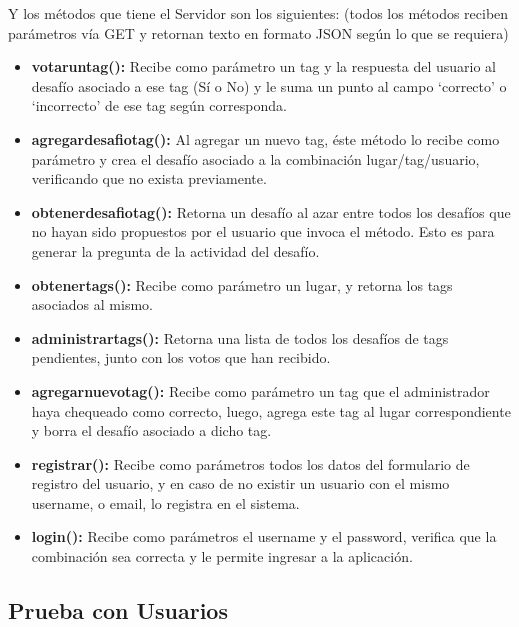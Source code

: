 \documentclass[10pt,letterpaper]{article}
\begin{document}
Y los métodos que tiene el Servidor son los siguientes: (todos los métodos reciben parámetros vía GET y retornan texto en formato JSON según lo que se requiera)\\

\begin{itemize}
\item \textbf{votaruntag():} Recibe como parámetro un tag y la respuesta del usuario al desafío asociado a ese tag (Sí o No) y le suma un punto al campo ‘correcto’ o ‘incorrecto’ de ese tag según corresponda.

\item \textbf{agregardesafiotag():} Al agregar un nuevo tag, éste método lo recibe como parámetro y crea el desafío asociado a la combinación lugar/tag/usuario, verificando que no exista previamente.

\item \textbf{obtenerdesafiotag():} Retorna un desafío al azar entre todos los desafíos que no hayan sido propuestos por el usuario que invoca el método. Esto es para generar la pregunta de la actividad del desafío.

\item \textbf{obtenertags():} Recibe como parámetro un lugar, y retorna los tags asociados al mismo.

\item \textbf{administrartags():} Retorna una lista de todos los desafíos de tags pendientes, junto con los votos que han recibido.

\item \textbf{agregarnuevotag():} Recibe como parámetro un tag que el administrador haya chequeado como correcto, luego, agrega este tag al lugar correspondiente y borra el desafío asociado a dicho tag.

\item \textbf{registrar():} Recibe como parámetros todos los datos del formulario de registro del usuario, y en caso de no existir un usuario con el mismo username, o email, lo registra en el sistema.

\item \textbf{login():} Recibe como parámetros el username y el password, verifica que la combinación sea correcta y le permite ingresar a la aplicación.

\end{itemize}

\subsection{Prueba con Usuarios}
\end{document}
